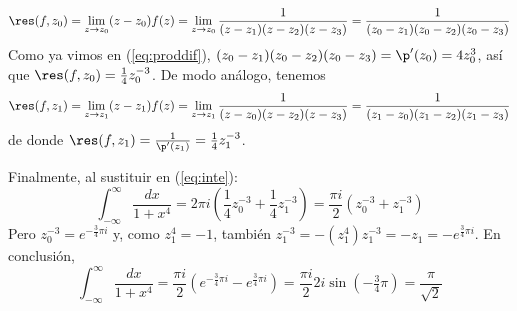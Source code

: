 \begin{sol}
\[
\res(f,z_0) = \lim_{z\to z_0}(z-z_0)f(z) = \lim_{z\to z_0}\frac{1}{(z-z_1)(z-z_2)(z-z_3)} = \frac{1}{(z_0-z_1)(z_0-z_2)(z_0-z_3)}
\]
Como ya vimos en (\ref{eq:proddif}), $(z_0-z_1)(z_0-z_2)(z_0-z_3) = \p'(z_0) = 4z_0^3$, así que $\res(f,z_0) = \frac{1}{4}z_0^{-3}$. De modo análogo, tenemos
\[
\res(f,z_1) = \lim_{z\to z_1}(z-z_1)f(z) = \lim_{z\to z_1}\frac{1}{(z-z_0)(z-z_2)(z-z_3)} = \frac{1}{(z_1-z_0)(z_1-z_2)(z_1-z_3)}
\]
de donde $\res(f,z_1) = \frac{1}{\p'(z_1)} = \frac{1}{4}z_1^{-3}$.\par\vspace{1em}
Finalmente, al sustituir en (\ref{eq:inte}):
\[
\int_{-\infty}^{\infty}\frac{dx}{1+x^4}=2\pi i\left(\frac{1}{4}z_0^{-3} + \frac{1}{4}z_1^{-3}\right)
=\frac{\pi i}{2}\left(z_0^{-3} + z_1^{-3}\right)
\]
Pero $z_0^{-3} = e^{-\frac34\pi i}$ y, como $z_1^4=-1$, también $z_1^{-3} = -(z_1^4)z_1^{-3} = -z_1 = -e^{\frac34\pi i}$. En conclusión,
\[
\int_{-\infty}^{\infty}\frac{dx}{1+x^4}
= \frac{\pi i}{2}\left(e^{-\frac34\pi i} - e^{\frac34\pi i}\right)
=\frac{\pi i}{2} 2i \sin(-\tfrac34\pi) = \frac{\pi}{\sqrt{2}}
\]
\end{sol}